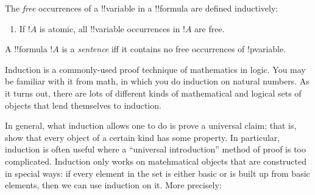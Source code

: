 \documentclass[../../include/open-logic-section]{subfiles}
\begin{document}


\begin{defn}
The \emph{free} occurrences of a !!{variable} in a !!{formula} are defined
inductively:
\begin{enumerate}
\item If $!A$ is atomic, all !!{variable} occurrences in $!A$ are free.







\end{enumerate}
\end{defn}

\begin{defn}[Sentence]
A !!{formula} $!A$ is a \emph{sentence} iff it contains no free
occurrences of !p{variable}.
\end{defn}

\begin{explain}
Induction is a commonly-used proof technique of mathematics in logic. 
You may be familiar with it from math, in which you do induction on 
natural numbers. As it turns out, there are lots of different kinds of 
mathematical and logical sets of objects that lend themselves to induction.

In general, what induction allows one to do is prove a universal claim; that 
is, show that every object of a certain kind has some property. In particular, 
induction is often useful where a ``universal introduction'' method of proof 
is too complicated. Induction only works on matehmatical objects that are 
constructed in special ways: if every element in the set is either basic or is 
built up from basic elements, then we can use induction on it. More precisely:
\end{explain}
\end{document}
